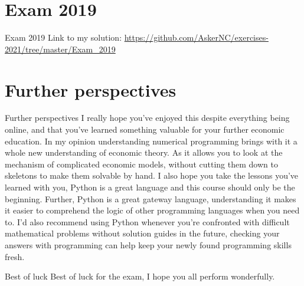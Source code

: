 \documentclass[10pt,danish,t,10pt]{beamer}
\begin{document}
\section{Exam 2019}

\begin{frame}{Exam 2019}
Link to my solution: \url{https://github.com/AskerNC/exercises-2021/tree/master/Exam_2019}
\end{frame}


\section{Further perspectives}
\begin{frame}{Further perspectives}
    I really hope you've enjoyed this despite everything being online, and that you've learned something valuable for your further economic education. In my opinion understanding numerical programming brings with it a whole new understanding of economic theory. As it allows you to look at the mechanism of complicated economic models, without cutting them down to skeletons to make them solvable by hand. \newline
    I also hope you take the lessons you've learned with you, Python is a great language and this course should only be the beginning. Further, Python is a great gateway language, understanding it makes it easier to comprehend the logic of other programming languages when you need to. I'd also recommend using Python whenever you're confronted with difficult mathematical problems without solution guides in the future, checking your answers with programming can help keep your newly found programming skills fresh. 
\end{frame}


\begin{frame}{Best of luck}
    Best of luck for the exam, I hope you all perform wonderfully.
\end{frame}
\end{document}
